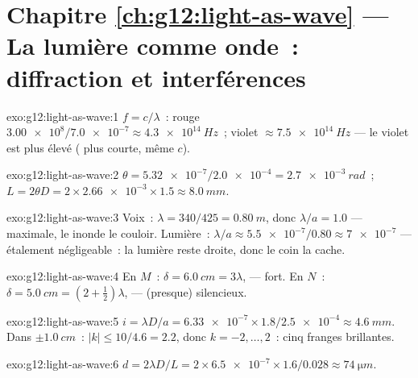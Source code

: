 \section*{Chapitre \ref{ch:g12:light-as-wave} --- La lumière comme onde~: diffraction et interférences}

\begin{solution}{exo:g12:light-as-wave:1}
$f = c/\lambda$~: rouge $\num{3.00e8}/\num{7.0e-7} \approx
\qty{4.3e14}{Hz}$~; violet $\approx \qty{7.5e14}{Hz}$ --- le violet est
plus élevé ( plus courte, même  $c$).
\end{solution}

\begin{solution}{exo:g12:light-as-wave:2}
$\theta = \num{5.32e-7}/\num{2.0e-4} = \qty{2.7e-3}{rad}$~;
$L = 2\theta D = 2 \times \num{2.66e-3} \times 1.5 \approx
\qty{8.0}{mm}$.
\end{solution}

\begin{solution}{exo:g12:light-as-wave:3}
Voix~: $\lambda = 340/425 = \qty{0.80}{m}$, donc $\lambda/a = 1.0$ ---
 maximale, le  inonde le couloir.
Lumière~: $\lambda/a \approx \num{5.5e-7}/0.80 \approx \num{7e-7}$ ---
étalement négligeable~: la lumière reste droite, donc le coin la cache.
\end{solution}

\begin{solution}{exo:g12:light-as-wave:4}
En $M$~: $\delta = \qty{6.0}{cm} = 3\lambda$,  --- fort.
En $N$~: $\delta = \qty{5.0}{cm} = (2 + \tfrac12)\lambda$, 
--- (presque) silencieux.
\end{solution}

\begin{solution}{exo:g12:light-as-wave:5}
$i = \lambda D/a = \num{6.33e-7} \times 1.8/\num{2.5e-4} \approx
\qty{4.6}{mm}$. Dans $\pm\qty{1.0}{cm}$~: $|k| \leq 10/4.6 = 2.2$,
donc $k = -2, \dots, 2$~: cinq franges brillantes.
\end{solution}

\begin{solution}{exo:g12:light-as-wave:6}
$d = 2\lambda D/L = 2 \times \num{6.5e-7} \times 1.6/0.028 \approx
\qty{74}{\micro m}$.
\end{solution}

